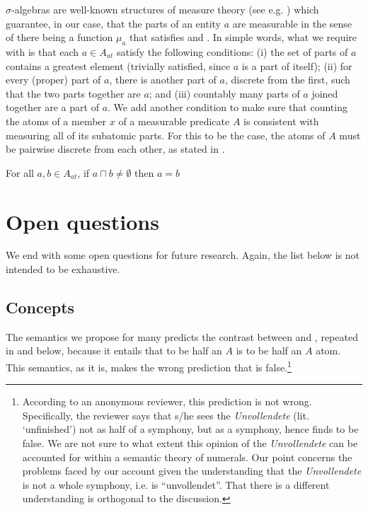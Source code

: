 \documentclass[output=paper]{langscibook}
\begin{document}
\noindent $\sigma$-algebras are well-known structures of measure theory (see e.g. \citealt{Cohn:1980}) which guarantee, in our case, that the parts of an entity $a$ are measurable in the sense of there being a function $\mu_a$ that satisfies  and . In simple words, what we require with  is that each $a \in A_{at}$ satisfy the following conditions: (i) the set of parts of $a$ contains a greatest element (trivially satisfied, since $a$ is a part of itself); (ii) for every (proper) part of $a$, there is another part of $a$, discrete from the first, such that the two parts together are $a$; and (iii) countably many parts of $a$ joined together are a part of $a$. We add another condition to make sure that counting the atoms of a member $x$ of a measurable predicate $A$ is consistent with measuring all of its subatomic parts. For this to be the case, the atoms of $A$ must be pairwise discrete from each other, as stated in .

\ea For all $a, b \in A_{at}$, if $a\sqcap b\ne\emptyset$ then $a=b$\label{hai-tri:condition-subatomic-parts}
\z

\section{Open questions}

We end with some open questions for future research. Again, the list below is not intended to be exhaustive. %

\subsection{Concepts}  

The semantics we propose for {\sc many} predicts the contrast between  and , repeated in  and  below, because it entails that to be half an $A$ is to be half an $A$ atom. This semantics, as it is, makes the wrong prediction that  is false.\footnote{According to an anonymous reviewer, this prediction is not wrong. Specifically, the reviewer says that s/he sees the \textit{Unvollendete} (lit. `unfinished') not as half of a symphony, but as a symphony, hence finds  to be false. We are not sure to what extent this opinion of the \textit{Unvollendete} can be accounted for within a semantic theory of numerals. Our point concerns the problems faced by our account given the understanding that the \textit{Unvollendete} is not a whole symphony, i.e. is ``unvollendet''. That there is a different understanding is orthogonal to the discussion.}
\end{document}
